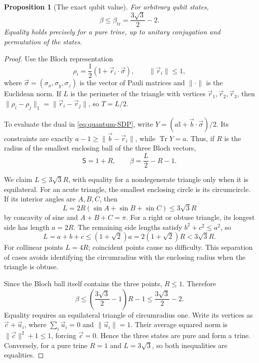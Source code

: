 \documentclass[10pt,a4paper]{amsart}
\newtheorem{proposition}[theorem]{Proposition}
\newcommand{\Tr}{\operatorname{Tr}}
\newcommand{\id}{\mathbb I}
\newcommand{\1}{\mathbf 1}
\newcommand{\Sopt}{\mathsf S}
\newcommand{\btr}{\beta_{\mathrm{tr}}}
\begin{document}
\begin{proposition}[The exact qubit value]\label{prop:qubit}
For arbitrary qubit states,
\begin{equation}\label{eq:qubit-bound}
 \beta\le\btr=\frac{3\sqrt3}{2}-2.
\end{equation}
Equality holds precisely for a pure trine, up to unitary conjugation and
permutation of the states.
\end{proposition}
\begin{proof}
Use the Bloch representation
\[
 \rho_i=\frac12(\id+\vec r_i\cdot\vec\sigma),\qquad
 \|\vec r_i\|\le1,
\]
where $\vec\sigma=(\sigma_x,\sigma_y,\sigma_z)$ is the vector of Pauli matrices
and $\|\cdot\|$ is the Euclidean norm. If $L$ is the perimeter of the triangle
with vertices $\vec r_1,\vec r_2,\vec r_3$, then
$\|\rho_i-\rho_j\|_1=\|\vec r_i-\vec r_j\|$, so $T=L/2$.

To evaluate the dual in \eqref{eq:quantum-SDP}, write
$Y=(a\id+\vec b\cdot\vec\sigma)/2$. Its constraints are exactly
$a-1\ge\|\vec b-\vec r_i\|$, while $\Tr Y=a$. Thus, if $R$ is the radius of
the smallest enclosing ball of the three Bloch vectors,
\begin{equation}\label{eq:qubit-geometry}
 \Sopt=1+R,\qquad\beta=\frac L2-R-1.
\end{equation}

We claim $L\le3\sqrt3R$, with equality for a nondegenerate triangle only when
it is equilateral. For an acute triangle, the smallest enclosing circle is its
circumcircle. If its interior angles are $A,B,C$, then
\[
 L=2R(\sin A+\sin B+\sin C)\le3\sqrt3R
\]
by concavity of sine and $A+B+C=\pi$. For a right or obtuse triangle, its longest
side has length $a=2R$. The remaining side lengths satisfy $b^2+c^2\le a^2$,
so
\[
 L=a+b+c\le(1+\sqrt2)a=2(1+\sqrt2)R<3\sqrt3R.
\]
For collinear points $L=4R$; coincident points cause no difficulty. This
separation of cases avoids identifying the circumradius with the enclosing
radius when the triangle is obtuse.

Since the Bloch ball itself contains the three points, $R\le1$. Therefore
\[
 \beta\le\left(\frac{3\sqrt3}{2}-1\right)R-1
 \le\frac{3\sqrt3}{2}-2.
\]
Equality requires an equilateral triangle of circumradius one. Write its
vertices as $\vec c+\vec u_i$, where $\sum_i\vec u_i=0$ and
$\|\vec u_i\|=1$. Their average squared norm is $\|\vec c\|^2+1\le1$,
forcing $\vec c=0$. Hence the three states are pure and form a trine.
Conversely, for a pure trine $R=1$ and $L=3\sqrt3$, so both inequalities
are equalities.
\end{proof}
\end{document}
